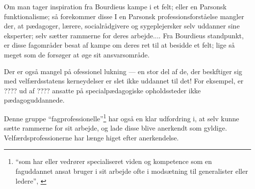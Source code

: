 
Om man tager inspiration fra Bourdieus kampe i et felt; eller en Parsonsk funktionalisme; så forekommer disse 
I en Parsonsk professionsforståelse mangler der, at pædagoger, lærere, socialrådgivere og sygeplejersker selv uddanner sine eksperter; selv sætter rammerne for deres arbejde....
Fra Bourdieus standpunkt, er disse fagområder besat af kampe om deres ret til at besidde et felt; lige så meget som de forsøger at øge sit ansvarsområde.

Der er også mangel på ofessionel lukning — en stor del af de, der beskftiger sig med velfærdsstatens kerneydelser er slet ikke uddannet til det! For eksempel, er ???? ud af ???? ansatte på specialpædagogiske opholdssteder ikke pædagoguddannede.

Denne gruppe “fagprofessionelle”\footnote{“som har eller vedrører specialiseret viden og kompetence som en faguddannet ansat bruger i sit arbejde ofte i modsætning til generalister eller ledere”, \autocite{FagprofessionelDanskeOrdbog}} har også en klar udfordring i, at selv kunne sætte rammerne for sit arbejde, og lade disse blive anerkendt som gyldige.
Velfærdsprofessionerne har længe higet efter anerkendelse.
